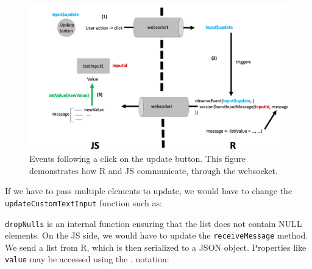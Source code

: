 \documentclass[]{book}
\newenvironment{Shaded}{\begin{snugshade}}{\end{snugshade}}
\newcommand{\ControlFlowTok}[1]{\textcolor[rgb]{0.13,0.29,0.53}{\textbf{#1}}}
\newcommand{\DataTypeTok}[1]{\textcolor[rgb]{0.13,0.29,0.53}{#1}}
\newcommand{\KeywordTok}[1]{\textcolor[rgb]{0.13,0.29,0.53}{\textbf{#1}}}
\newcommand{\NormalTok}[1]{#1}
\newcommand{\OperatorTok}[1]{\textcolor[rgb]{0.81,0.36,0.00}{\textbf{#1}}}
\newcommand{\OtherTok}[1]{\textcolor[rgb]{0.56,0.35,0.01}{#1}}
\newcommand{\StringTok}[1]{\textcolor[rgb]{0.31,0.60,0.02}{#1}}
\begin{document}
\begin{figure}
\includegraphics[width=20in]{images/survival-kit/shiny-update-inputs} \caption{Events following a click on the update button. This figure demonstrates how R and JS communicate, through the websocket.}\label{fig:shiny-update-inputs}
\end{figure}

If we have to pass multiple elements to update, we would have to change the \texttt{updateCustomTextInput} function such as:

\begin{Shaded}
\end{Shaded}

\texttt{dropNulls} is an internal function ensuring that the list does not contain NULL elements. On the JS side, we would have to update the \texttt{receiveMessage} method. We send a list from R, which is then serialized to a JSON object. Properties like \texttt{value} may be accessed using the . notation:
\end{document}
